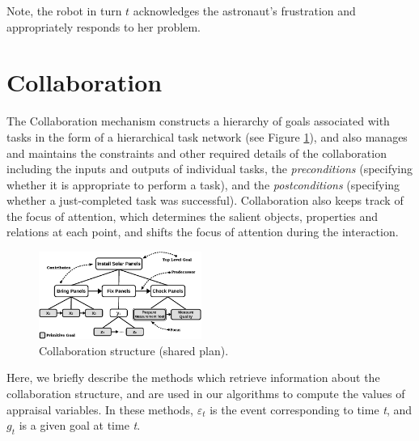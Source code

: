\documentclass{aamas2016}
\begin{document}
\vspace*{-1mm}
Note, the robot in turn $t$ acknowledges the astronaut's frustration and
appropriately responds to her problem.

\section{Collaboration}

The Collaboration mechanism constructs a hierarchy of goals associated with
tasks in the form of a hierarchical task network (see Figure \ref{fig:cs}), and
also manages and maintains the constraints and other required details of the
collaboration including the inputs and outputs of individual tasks, the
\textit{preconditions} (specifying whether it is appropriate to perform a task),
and the \textit{postconditions} (specifying whether a just-completed task was
successful). Collaboration also keeps track of the focus of attention, which
determines the salient objects, properties and relations at each point, and
shifts the focus of attention during the interaction.

\begin{figure}[tbh]
  \centering
  \includegraphics[width=0.474\textwidth]{figure/collaborationStructure-croped.pdf}
  \caption{{\fontsize{9}{9}\selectfont Collaboration structure (shared plan).}}
  \label{fig:cs}
  \vspace*{-2mm}
\end{figure}

Here, we briefly describe the methods which retrieve information about the
collaboration structure, and are used in our algorithms to compute the values of
appraisal variables. In these methods, $\varepsilon_t$ is the event
corresponding to time \textit{t}, and $g_t$ is a given goal at time \textit{t}. 
\end{document}
